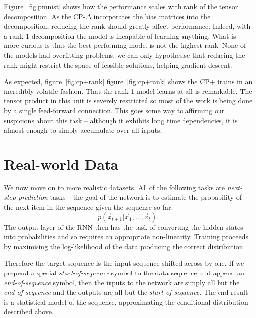 Figure~\ref{fig:pmnist} shows how the performance scales with rank of
the tensor decomposition. As the CP-\(\Delta\) incorporates the
bias matrices into the decomposition, reducing the rank should greatly
affect performance. Indeed, with a rank 1 decomposition the model is
incapable of learning anything. What is more curious is that the
best performing model is not the highest rank. None of the models
had overfitting problems, we can only hypothesise that reducing the rank
might restrict the space of feasible solutions, helping gradient descent.

As expected, figure~\ref{fig:cp+rank} figure~\ref{fig:cp+rank} shows the
CP+ trains in an incredibly volatile fashion. That the rank 1 model learns
at all is remarkable. The tensor product in this unit is severely
restricted so most of the work is being done by a single
feed-forward connection. This goes some way to affirming our suspicions
about this task -- although it exhibits long time dependencies, it
is almost enough to simply accumulate over all inputs.

\section{Real-world Data}
We now move on to more realistic datasets. All of the following tasks are
\emph{next-step prediction} tasks -- the goal of the network is to estimate
the probability of the next item in the sequence given the sequence so far:
\begin{equation} \label{eq:seqprob}
	p(\vec{x}_{t+1} | \vec{x}_{1},\ldots,\vec{x}_{t}).
\end{equation} The output layer of the RNN then has the task of converting
the hidden states into probabilities and so requires an appropriate non-linearity.
Training proceeds by maximising the log-likelihood of the data producing the
correct distribution.

Therefore the target sequence is the input
sequence shifted across by one. If we prepend a special \emph{start-of-sequence}
symbol to the data sequence and append an \emph{end-of-sequence} symbol,
then the inputs to the network are simply all but the \emph{end-of-sequence}
and the outputs are all but the \emph{start-of-sequence}.
The end result is a statistical model of the sequence, approximating the
conditional distribution described above.

